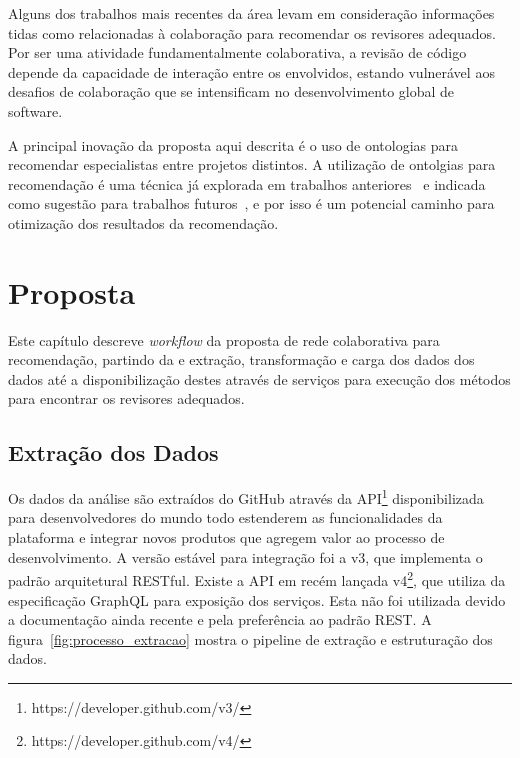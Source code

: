 \documentclass[a4paper,12pt]{monografia}
\theoremstyle{plain}
\theoremstyle{definition}
\theoremstyle{remark}
\begin{document}
Alguns dos trabalhos mais recentes da área levam em consideração informações tidas como relacionadas à colaboração para recomendar os revisores adequados\cite{ouni2016, zanjani2016}. Por ser uma atividade fundamentalmente colaborativa, a revisão de código depende da capacidade de interação entre os envolvidos, estando vulnerável aos desafios de colaboração que se intensificam no desenvolvimento global de software.

A principal inovação da proposta aqui descrita é o uso de ontologias para recomendar especialistas entre projetos distintos. A utilização de ontolgias para recomendação é uma técnica já explorada em trabalhos anteriores~\cite{middleton2001,middleton2004} e indicada como sugestão para trabalhos futuros~\cite{adomavicius2005}, e por isso é um potencial caminho para otimização dos resultados da recomendação.

\chapter{Proposta}\label{cha:proposta}

Este capítulo descreve \textit{workflow} da proposta de rede colaborativa para recomendação, partindo da e extração, transformação e carga dos dados dos dados até a disponibilização destes através de serviços para execução dos métodos para encontrar os revisores adequados.

\section{Extração dos Dados}

Os dados da análise são extraídos do GitHub através da API\footnote{https://developer.github.com/v3/} disponibilizada para desenvolvedores do mundo todo estenderem as funcionalidades da plataforma e integrar novos produtos que agregem valor ao processo de desenvolvimento. A versão estável para integração foi a v3, que implementa o padrão arquitetural RESTful\cite{fielding2002}. Existe a API em recém lançada v4\footnote{https://developer.github.com/v4/}, que utiliza da especificação GraphQL para exposição dos serviços. Esta não foi utilizada devido a documentação ainda recente e pela preferência ao padrão REST. A figura~\ref{fig:processo_extracao} mostra o pipeline de extração e estruturação dos dados.
\end{document}
